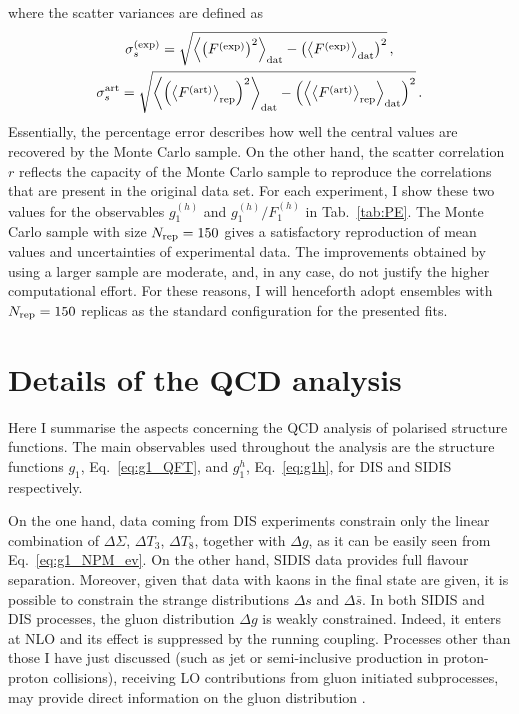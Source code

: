 where the scatter variances are defined as
\begin{gather}
  \sigma^{\textrm{(exp)}}_s = \sqrt{\left< \left( F^{\textrm{(exp)}} \right)^2 \right>_{\textrm{dat}} - \left( \left< F^{\textrm{(exp)}} \right>_{\textrm{dat}} \right)^2} \,,\\
  \sigma^{\textrm{art}}_s = \sqrt{\left< \left( \left<F^{\textrm{(art)}}\right>_{\textrm{rep}} \right)^2 \right>_{\textrm{dat}} - \left( \left< \left<F^{\textrm{(art)}}\right>_{\textrm{rep}} \right>_{\textrm{dat}} \right)^2} \,.
\end{gather}
Essentially, the percentage error describes how well the central values are recovered by the Monte Carlo sample. On the other hand, the scatter correlation $r$ reflects the capacity of the Monte Carlo sample to reproduce the correlations that are present in the original data set. For each experiment, I show these two values for the observables $g_1^{(h)}$ and $g_1^{(h)}/F_1^{(h)}$ in Tab.~\ref{tab:PE}. The Monte Carlo sample with size $N_{\textrm{rep}} = 150$ gives a satisfactory reproduction of mean values and uncertainties of experimental data. The improvements obtained by using a larger sample are moderate, and, in any case, do not justify the higher computational effort. For these reasons, I will henceforth adopt ensembles with $N_{\textrm{rep}} = 150$ replicas as the standard configuration for the presented fits.

\section{Details of the QCD analysis}
\label{sec:4.2}
Here I summarise the aspects concerning the QCD analysis of polarised structure functions. The main observables used throughout the analysis are the structure functions $g_1$, Eq.~\eqref{eq:g1_QFT}, and $g_1^h$, Eq.~\eqref{eq:g1h}, for DIS and SIDIS respectively.%

On the one hand, data coming from DIS experiments constrain only the linear combination of $\Delta \Sigma$, $\Delta T_3$, $\Delta T_8$, together with $\Delta g$, as it can be easily seen from Eq.~\eqref{eq:g1_NPM_ev}. On the other hand, SIDIS data provides full flavour separation. Moreover, given that data with kaons in the final state are given, it is possible to constrain the strange distributions $\Delta s$ and $\Delta \bar{s}$. In both SIDIS and DIS processes, the gluon distribution $\Delta g$ is weakly constrained. Indeed, it enters at NLO and its effect is suppressed by the running coupling. Processes other than those I have just discussed (such as jet or semi-inclusive production in proton-proton collisions), receiving LO contributions from gluon initiated subprocesses, may provide direct information on the gluon distribution \cite{Rojo:2015acz}.%

